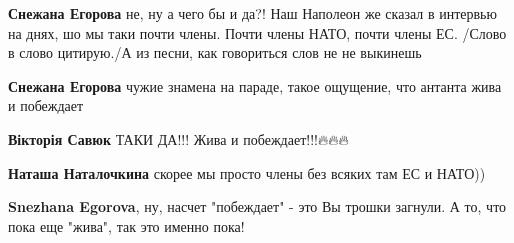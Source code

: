 \begin{itemize}
\begin{itemize}
 
\textbf{Снежана Егорова} не, ну а чего бы и да?! Наш Наполеон же сказал в интервью на днях, шо мы таки почти члены. Почти члены НАТО, почти члены ЕС. /Слово в слово цитирую./А из песни, как говориться слов не не выкинешь\Smiley[1.0][yellow]

 
\textbf{Снежана Егорова} чужие знамена на параде, такое ощущение, что антанта жива и побеждает


 
\textbf{Вікторія Савюк} ТАКИ ДА!!!
Жива и побеждает!!!🔥🔥🔥

 
\textbf{Наташа Наталочкина} скорее мы просто члены без всяких там ЕС и НАТО))

 
\textbf{Snezhana Egorova}, ну, насчет "побеждает" - это Вы трошки загнули. А то, что пока еще "жива", так это именно пока!
\end{itemize}

 

\end{itemize}
